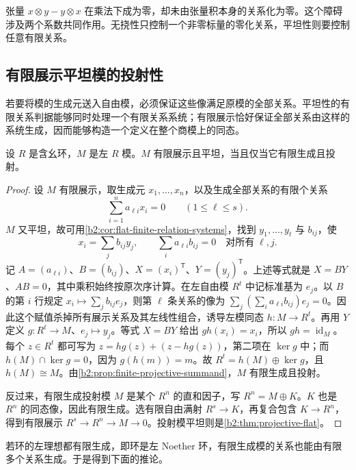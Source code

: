 张量 \(x\otimes y-y\otimes x\) 在乘法下成为零，却未由张量积本身的关系化为零。这个障碍涉及两个系数共同作用。无挠性只控制一个非零标量的零化关系，平坦性则要控制任意有限关系。

\subsection{有限展示平坦模的投射性}
\label{b2:subsec:0704:02}

若要将模的生成元送入自由模，必须保证这些像满足原模的全部关系。平坦性的有限关系判据能够同时处理一个有限关系系统；有限展示恰好保证全部关系由这样的系统生成，因而能够构造一个定义在整个商模上的同态。

\begin{theorem}\label{b2:thm:fp-flat-projective}
	设 \(R\) 是含幺环，\(M\) 是左 \(R\) 模。\(M\) 有限展示且平坦，当且仅当它有限生成且投射。
\end{theorem}
\begin{proof}
	设 \(M\) 有限展示，取生成元 \(x_1,\ldots,x_n\)，以及生成全部关系的有限个关系
	\[
		\sum_{i=1}^n a_{\ell i}x_i=0\qquad(1\le\ell\le s).
	\]
	\(M\) 又平坦，故可用\cref{b2:cor:flat-finite-relation-systems}，找到 \(y_1,\ldots,y_t\) 与 \(b_{ij}\)，使
	\[
		x_i=\sum_jb_{ij}y_j,\qquad \sum_i a_{\ell i}b_{ij}=0\quad\text{对所有}\;\ell,j.
	\]
	记 \(A=(a_{\ell i})\)、\(B=(b_{ij})\)、\(X=(x_i)^{\mathsf T}\)、\(Y=(y_j)^{\mathsf T}\)。上述等式就是 \(X=BY\)、\(AB=0\)，其中乘积始终按原次序计算。在左自由模 \(R^t\) 中记标准基为 \(e_j\)。以 \(B\) 的第 \(i\) 行规定 \(x_i\mapsto\sum_j b_{ij}e_j\)，则第 \(\ell\) 条关系的像为 \(\sum_j(\sum_i a_{\ell i}b_{ij})e_j=0\)。因此这个赋值杀掉所有展示关系及其左线性组合，诱导左模同态 \(h:M\to R^t\)。再用 \(Y\) 定义 \(g:R^t\to M\)、\(e_j\mapsto y_j\)。等式 \(X=BY\) 给出 \(gh(x_i)=x_i\)，所以 \(gh=\operatorname{id}_M\)。每个 \(z\in R^t\) 都可写为 \(z=hg(z)+(z-hg(z))\)，第二项在 \(\ker g\) 中；而 \(h(M)\cap\ker g=0\)，因为 \(g(h(m))=m\)。故 \(R^t=h(M)\oplus\ker g\)，且 \(h(M)\cong M\)。由\cref{b2:prop:finite-projective-summand}，\(M\) 有限生成且投射。

	反过来，有限生成投射模 \(M\) 是某个 \(R^n\) 的直和因子，写 \(R^n=M\oplus K\)。\(K\) 也是 \(R^n\) 的同态像，因此有限生成。选有限自由满射 \(R^s\to K\)，再复合包含 \(K\to R^n\)，得到有限展示 \(R^s\to R^n\to M\to0\)。投射模平坦则是\cref{b2:thm:projective-flat}。
\end{proof}

若环的左理想都有限生成，即环是左 Noether 环，有限生成模的关系也能由有限多个关系生成。于是得到下面的推论。


